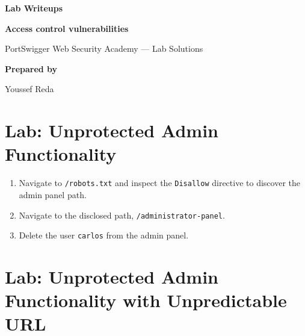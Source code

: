 \documentclass[11pt,a4paper]{article}
\newcommand{\DocumentType}{Lab Writeups}
\newcommand{\VulnerabilityTitle}{Access control vulnerabilities}
\newcommand{\AuthorName}{Youssef Reda}
\begin{document}
\begin{titlepage}
    \thispagestyle{empty}
    \centering

    \vspace*{1.8cm}
    {\Large\color{secondary}\bfseries \DocumentType\par}

    \vspace{1.2cm}
    {\Huge\bfseries\color{primary}\VulnerabilityTitle\par}

    \vspace{0.8cm}
    {\large PortSwigger Web Security Academy — Lab Solutions\par}

    \vfill
    \begin{flushleft}
        \vspace{0.6cm}
        \textbf{Prepared by}\par
        \AuthorName
    \end{flushleft}
\end{titlepage}

\tableofcontents
\clearpage
{}


\section{Lab: Unprotected Admin Functionality}
\vspace{0.3cm}

\begin{enumerate}
    \item Navigate to \texttt{/robots.txt} and inspect the \texttt{Disallow} directive to discover the admin panel path.
    \item Navigate to the disclosed path, \texttt{/administrator-panel}.
    \item Delete the user \texttt{carlos} from the admin panel.
\end{enumerate}

\section{Lab: Unprotected Admin Functionality with Unpredictable URL}
\vspace{0.3cm}
\end{document}
